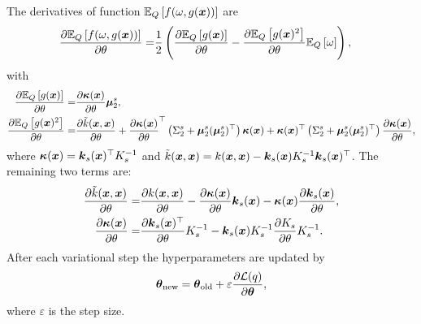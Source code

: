 The derivatives of function $\mathbb{E}_{Q}\left[ f(\omega,g(\boldsymbol{x})) \right]$ are
\begin{equation}
\begin{split}
\frac{\partial \mathbb{E}_{Q}\left[ f(\omega,g(\boldsymbol{x})) \right]}{\partial \theta} = & \frac{1}{2}\left(\frac{\partial \mathbb{E}_{Q}\left[ g(\boldsymbol{x}) \right]}{\partial \theta} - \frac{\partial \mathbb{E}_{Q}\left[ g(\boldsymbol{x})^2 \right]}{\partial \theta}\mathbb{E}_{Q}\left[ \omega \right]\right),
\end{split}
\end{equation}
with
\begin{equation}
\begin{split}
\frac{\partial \mathbb{E}_{Q}\left[  g(\boldsymbol{x}) \right]}{\partial \theta} = & \frac{\partial \boldsymbol\kappa(\boldsymbol{x})}{\partial \theta}\boldsymbol{\mu}_2^s, \\
\frac{\partial \mathbb{E}_{Q}\left[ g(\boldsymbol{x})^2 \right]}{\partial \theta} = & \frac{\partial \tilde{k}(\boldsymbol{x},\boldsymbol{x})}{\partial \theta} + \frac{\partial \boldsymbol{\kappa}(\boldsymbol{x})}{\partial \theta}^\top \left(\Sigma^s_2 + \boldsymbol{\mu}^s_2(\boldsymbol{\mu}^s_2)^\top\right) \boldsymbol{\kappa}(\boldsymbol{x}) + \boldsymbol{\kappa}(\boldsymbol{x})^\top \left(\Sigma_2^s + \boldsymbol{\mu}_2^s(\boldsymbol{\mu}_2^s)^\top\right) \frac{\partial \boldsymbol{\kappa}(\boldsymbol{x})}{\partial \theta},
\end{split}
\end{equation}
where $\boldsymbol{\kappa}(\boldsymbol{x})=\boldsymbol{k}_s(\boldsymbol{x})^\top K_s^{-1}$ and $\tilde{k}(\boldsymbol{x},\boldsymbol{x})=k(\boldsymbol{x},\boldsymbol{x}) - \boldsymbol{k}_s(\boldsymbol{x})K_s^{-1}\boldsymbol{k}_s(\boldsymbol{x})^\top$. The remaining two terms are:
\begin{equation}
\begin{split}
\frac{\partial \tilde{k}(\boldsymbol{x},\boldsymbol{x})}{\partial \theta} = & \frac{\partial k(\boldsymbol{x},\boldsymbol{x})}{\partial \theta} - \frac{\partial \boldsymbol{\kappa}(\boldsymbol{x})}{\partial \theta}\boldsymbol{k}_s(\boldsymbol{x}) - \boldsymbol{\kappa}(\boldsymbol{x})\frac{\partial \boldsymbol{k}_s(\boldsymbol{x})}{\partial \theta}, \\
\frac{\partial \boldsymbol{\kappa}(\boldsymbol{x})}{\partial \theta} = & \frac{\partial \boldsymbol{k}_s(\boldsymbol{x})^\top}{\partial \theta}K_s^{-1} - \boldsymbol{k}_s(\boldsymbol{x})K_s^{-1}\frac{\partial K_s}{\partial \theta}K_s^{-1}.
\end{split}
\end{equation}
After each variational step the hyperparameters are updated by
\begin{equation}
\boldsymbol{\theta}_{\rm new} = \boldsymbol{\theta}_{\rm old} + \varepsilon\frac{\partial \mathcal{L}(q)}{\partial \boldsymbol{\theta}},
\end{equation}
where $\varepsilon$ is the step size.

